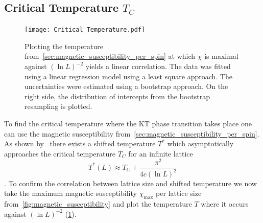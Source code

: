 \subsection{Critical Temperature \texorpdfstring{$T_C$}{T}}\label{sec:critical_temperature}
\begin{figure}
	\centering
	\texttt{[image: Critical\_Temperature.pdf]}
	\caption[Obtaining the critical temperature $\texorpdfstring{T_C}{T}$ by plotting the temperature $\texorpdfstring{T}{T}$ at $\texorpdfstring{\chi_\text{max}}{the magnetic susceptibility is maximum}$ against $\texorpdfstring{(\ln{L})^{-2}}{inverse logarithmic squared lattice size}$]{Plotting the temperature from~\cref{sec:magnetic_susceptibility_per_spin} at which $\chi$ is maximal against $(\ln{L})^{-2}$ yields a linear correlation. The data was fitted using a linear regression model using a least square approach. The uncertainties were estimated using a bootstrap approach. On the right side, the distribution of intercepts from the bootstrap resampling is plotted.}
	\label{fig:critical_temperature}
\end{figure}
To find the critical temperature where the KT phase transition takes place one can use the magnetic susceptibility from~\cref{sec:magnetic_susceptibility_per_spin}. As shown by~\citet{shifted} there exists a shifted temperature $T^*$ which asymptotically approaches the critical temperature $T_C$ for an infinite lattice
\begin{equation}\label{eq:shifted_temperature}
	T^*(L) \approx T_C + \frac{\pi^2}{4c (\ln{L})^2}
\end{equation}
\cite[eq. 3]{shifted}. To confirm the correlation between lattice size and shifted temperature we now take the maximum magnetic susceptibility $\chi_\text{max}$ per lattice size from~\cref{fig:magnetic_susceptibility} and plot the temperature $T$ where it occurs against $(\ln{L})^{-2}$ (\cref{fig:critical_temperature}).

